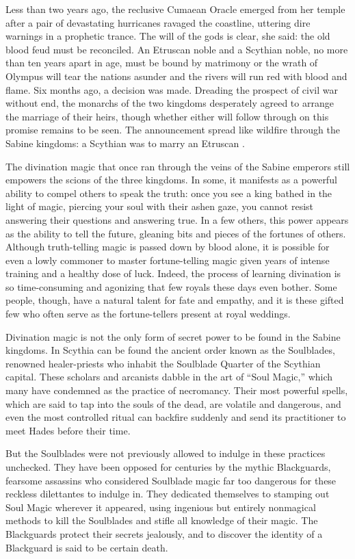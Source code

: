 \documentclass[blue]{Kos}
\begin{document}
Less than two years ago, the reclusive Cumaean Oracle emerged from her temple after a pair of devastating hurricanes ravaged the coastline, uttering dire warnings in a prophetic trance. The will of the gods is clear, she said: the old blood feud must be reconciled. An Etruscan noble and a Scythian noble, no more than ten years apart in age, must be bound by matrimony or the wrath of Olympus will tear the nations asunder and the rivers will run red with blood and flame. Six months ago, a decision was made. Dreading the prospect of civil war without end, the monarchs of the two kingdoms desperately agreed to arrange the marriage of their heirs, though whether either will follow through on this promise remains to be seen. The announcement spread like wildfire through the Sabine kingdoms: a Scythian \cBride{\prince} was to marry an Etruscan \cGroom{\prince}.

The divination magic that once ran through the veins of the Sabine emperors still empowers the scions of the three kingdoms. In some, it manifests as a powerful ability to compel others to speak the truth: once you see a king bathed in the light of magic, piercing your soul with their ashen gaze, you cannot resist answering their questions and answering true. In a few others, this power appears as the ability to tell the future, gleaning bits and pieces of the fortunes of others. Although truth-telling magic is passed down by blood alone, it is possible for even a lowly commoner to master fortune-telling magic given years of intense training and a healthy dose of luck. Indeed, the process of learning divination is so time-consuming and agonizing that few royals these days even bother. Some people, though, have a natural talent for fate and empathy, and it is these gifted few who often serve as the fortune-tellers present at royal weddings.

Divination magic is not the only form of secret power to be found in the Sabine kingdoms. In Scythia can be found the ancient order known as the Soulblades, renowned healer-priests who inhabit the Soulblade Quarter of the Scythian capital. These scholars and arcanists dabble in the art of ``Soul Magic,'' which many have condemned as the practice of necromancy. Their most powerful spells, which are said to tap into the souls of the dead, are volatile and dangerous, and even the most controlled ritual can backfire suddenly and send its practitioner to meet Hades before their time. 

But the Soulblades were not previously allowed to indulge in these practices unchecked. They have been opposed for centuries by the mythic Blackguards, fearsome assassins who considered Soulblade magic far too dangerous for these reckless dilettantes to indulge in. They dedicated themselves to stamping out Soul Magic wherever it appeared, using ingenious but entirely nonmagical methods to kill the Soulblades and stifle all knowledge of their magic. The Blackguards protect their secrets jealously, and to discover the identity of a Blackguard is said to be certain death.
\end{document}
